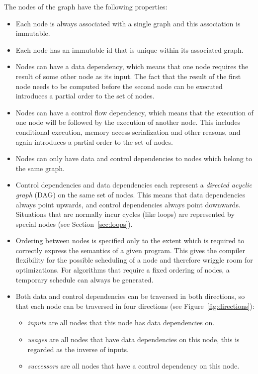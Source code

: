\documentclass[twocolumn]{svjour3}
\begin{document}
The nodes of the graph have the following properties:
\begin{itemize}
    \item Each node is always associated with a single graph and this association is immutable.
    \item Each node has an immutable id that is unique within its associated graph.
    \item Nodes can have a data dependency, which means that one node requires the result of some other node as its input. The fact that the result of the first node needs to be computed before the second node can be executed introduces a partial order to the set of nodes.
    \item Nodes can have a control flow dependency, which means that the execution of one node will be followed by the execution of another node. This includes conditional execution, memory access serialization and other reasons, and again introduces a partial order to the set of nodes.
    \item Nodes can only have data and control dependencies to nodes which belong to the same graph.
    \item Control dependencies and data dependencies each represent a \emph{directed acyclic graph} (DAG) on the same set of nodes. This means that data dependencies always point upwards, and control dependencies always point downwards. Situations that are normally incur cycles (like loops) are represented by special nodes (see Section~\ref{sec:loops}).
	\item Ordering between nodes is specified only to the extent which is required to correctly express the semantics of a given program. This gives the compiler flexibility for the possible scheduling of a node and therefore wriggle room for optimizations. For algorithms that require a fixed ordering of nodes, a temporary schedule can always be generated.
    \item Both data and control dependencies can be traversed in both directions, so that each node can be traversed in four directions (see Figure~\ref{fig:directions}):
    \begin{itemize}
        \item \emph{inputs} are all nodes that this node has data dependencies on.
        \item \emph{usages} are all nodes that have data dependencies on this node, this is regarded as the inverse of inputs.
        \item \emph{successors} are all nodes that have a control dependency on this node.

\end{itemize}
\end{itemize}
\end{document}
